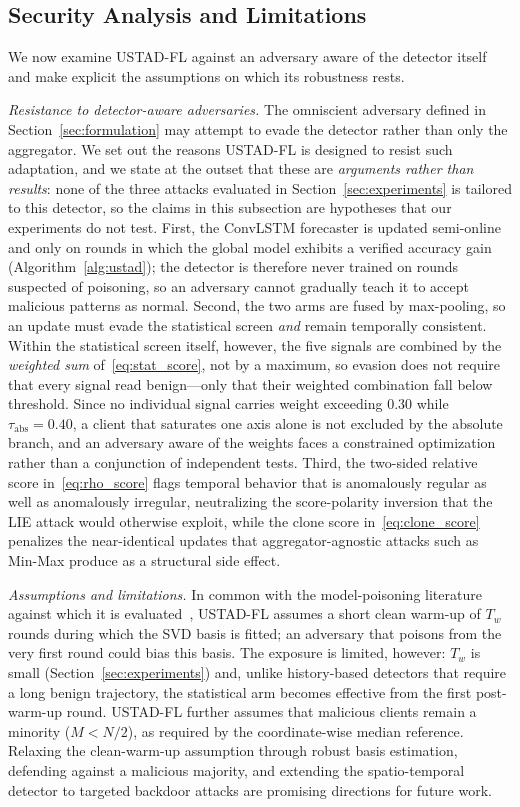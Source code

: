\documentclass[journal]{IEEEtran}
\begin{document}
\subsection{Security Analysis and Limitations}
\label{sec:security}
We now examine USTAD-FL against an adversary aware of the detector itself and make explicit the assumptions on which its robustness rests.

\noindent\textit{Resistance to detector-aware adversaries.} The omniscient adversary defined in Section~\ref{sec:formulation} may attempt to evade the detector rather than only the aggregator. We set out the reasons USTAD-FL is designed to resist such adaptation, and we state at the outset that these are \emph{arguments rather than results}: none of the three attacks evaluated in Section~\ref{sec:experiments} is tailored to this detector, so the claims in this subsection are hypotheses that our experiments do not test. First, the ConvLSTM forecaster is updated semi-online and only on rounds in which the global model exhibits a verified accuracy gain (Algorithm~\ref{alg:ustad}); the detector is therefore never trained on rounds suspected of poisoning, so an adversary cannot gradually teach it to accept malicious patterns as normal. Second, the two arms are fused by max-pooling, so an update must evade the statistical screen \emph{and} remain temporally consistent. Within the statistical screen itself, however, the five signals are combined by the \emph{weighted sum} of~\eqref{eq:stat_score}, not by a maximum, so evasion does not require that every signal read benign---only that their weighted combination fall below threshold. Since no individual signal carries weight exceeding $0.30$ while $\tau_{\mathrm{abs}} = 0.40$, a client that saturates one axis alone is not excluded by the absolute branch, and an adversary aware of the weights faces a constrained optimization rather than a conjunction of independent tests. Third, the two-sided relative score in~\eqref{eq:rho_score} flags temporal behavior that is anomalously regular as well as anomalously irregular, neutralizing the score-polarity inversion that the LIE attack would otherwise exploit, while the clone score in~\eqref{eq:clone_score} penalizes the near-identical updates that aggregator-agnostic attacks such as Min-Max produce as a structural side effect.

\noindent\textit{Assumptions and limitations.} In common with the model-poisoning literature against which it is evaluated~\cite{baruch2019little, shejwalkar2021manipulating}, USTAD-FL assumes a short clean warm-up of $T_w$ rounds during which the SVD basis is fitted; an adversary that poisons from the very first round could bias this basis. The exposure is limited, however: $T_w$ is small (Section~\ref{sec:experiments}) and, unlike history-based detectors that require a long benign trajectory, the statistical arm becomes effective from the first post-warm-up round. USTAD-FL further assumes that malicious clients remain a minority ($M < N/2$), as required by the coordinate-wise median reference. Relaxing the clean-warm-up assumption through robust basis estimation, defending against a malicious majority, and extending the spatio-temporal detector to targeted backdoor attacks are promising directions for future work.
\end{document}
